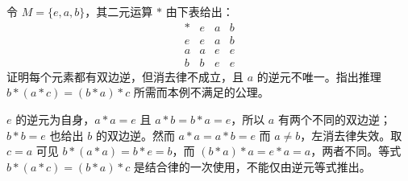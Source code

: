 \begin{exercise}\label{b1:ex:01-inverses-without-associativity}
	令 \(M=\{e,a,b\}\)，其二元运算 \(*\) 由下表给出：
	\[
		\begin{array}{c|ccc}
			* & e & a & b\\ \hline e & e & a & b\\
			a & a & e & e\\
			b & b & e & e
		\end{array}
	\]
	证明每个元素都有双边逆，但消去律不成立，且 \(a\) 的逆元不唯一。指出推理 \(b*(a*c)=(b*a)*c\) 所需而本例不满足的公理。
\end{exercise}
\begin{solution}
	\(e\) 的逆元为自身，\(a*a=e\) 且 \(a*b=b*a=e\)，所以 \(a\) 有两个不同的双边逆；\(b*b=e\) 也给出 \(b\) 的双边逆。然而 \(a*a=a*b=e\) 而 \(a\ne b\)，左消去律失效。取 \(c=a\) 可见 \(b*(a*a)=b*e=b\)，而 \((b*a)*a=e*a=a\)，两者不同。等式 \(b*(a*c)=(b*a)*c\) 是结合律的一次使用，不能仅由逆元等式推出。
\end{solution}
